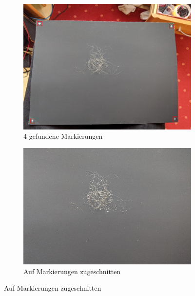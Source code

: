 \documentclass[german,a4paper, 12pt]{llncs}
\begin{document}
\begin{figure}[H]
	\medskip
	\begin{subfigure}{0.48\textwidth}
		\includegraphics[width=\linewidth]{figBina/02foundDots.png}
		\caption{4 gefundene Markierungen} \label{fig:c}
	\end{subfigure}\hspace*{\fill}
	\begin{subfigure}{0.48\textwidth}
		\includegraphics[width=\linewidth]{figBina/03crop image.png}
		\caption{Auf Markierungen zugeschnitten} \label{fig:d}
	\end{subfigure}
	

\end{figure}
\end{document}
